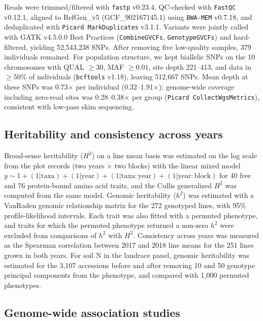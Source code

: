 Reads were trimmed/filtered with \texttt{fastp} v0.23.4, QC-checked with \texttt{FastQC} v0.12.1, aligned to RefGen\_v5 (GCF\_902167145.1) using \texttt{BWA-MEM} v0.7.18, and deduplicated with \texttt{Picard MarkDuplicates} v3.1.1. Variants were jointly called with GATK v4.5.0.0 Best Practices (\texttt{CombineGVCFs}, \texttt{GenotypeGVCFs}) and hard-filtered, yielding 52,543,238 SNPs. After removing five low-quality samples, 379 individuals remained. For population structure, we kept biallelic SNPs on the 10 chromosomes with QUAL $\ge 30$, MAF $\ge 0.01$, site depth 221--413, and data in $\ge$50\% of individuals (\texttt{bcftools} v1.18), leaving 512,667 SNPs. Mean depth at these SNPs was 0.73$\times$ per individual (0.32--1.91$\times$); genome-wide coverage including zero-read sites was 0.28--0.38$\times$ per group (\texttt{Picard CollectWgsMetrics}), consistent with low-pass skim sequencing.

\subsection{Heritability and consistency across years}
Broad-sense heritability ($H^2$) on a line mean basis was estimated on the log scale from the plot records (two years $\times$ two blocks) with the linear mixed model $y \sim 1 + (1|\mathrm{taxa}) + (1|\mathrm{year}) + (1|\mathrm{taxa{:}year}) + (1|\mathrm{year{:}block})$ for 40 free and 76 protein-bound amino acid traits, and the Cullis generalized $H^2$ was computed from the same model. Genomic heritability ($h^2$) was estimated with a VanRaden genomic relationship matrix for the 272 genotyped lines, with 95\% profile-likelihood intervals. Each trait was also fitted with a permuted phenotype, and traits for which the permuted phenotype returned a non-zero $h^2$ were excluded from comparisons of $h^2$ with $H^2$. Consistency across years was measured as the Spearman correlation between 2017 and 2018 line means for the 251 lines grown in both years. For soil N in the landrace panel, genomic heritability was estimated for the 3,107 accessions before and after removing 10 and 50 genotype principal components from the phenotype, and compared with 1,000 permuted phenotypes.

\subsection{Genome-wide association studies}

